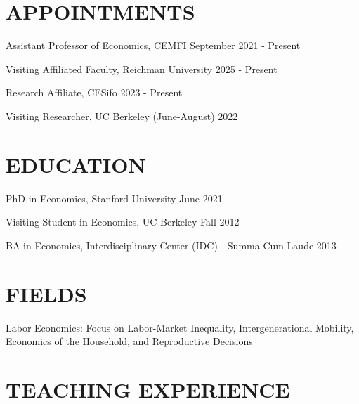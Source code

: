 \documentclass[margin]{res} %
\begin{document}
\begin{resume}


\section{APPOINTMENTS}

Assistant Professor of Economics, CEMFI \hfill September 2021 - Present

Visiting Affiliated Faculty, Reichman University \hfill 2025 - Present

Research Affiliate, CESifo \hfill 2023 - Present

Visiting Researcher, UC Berkeley (June-August) \hfill 2022


\section{EDUCATION}

PhD in Economics, Stanford University \hfill June 2021

Visiting Student in Economics, UC Berkeley  \hfill Fall 2012 

BA in Economics, Interdisciplinary Center (IDC) - Summa Cum Laude \hfill 2013

 
\section{FIELDS}  
 Labor Economics: Focus on Labor-Market Inequality, Intergenerational Mobility, Economics of the Household, and Reproductive Decisions
 


\section{TEACHING EXPERIENCE}


\end{resume}
\end{document}
